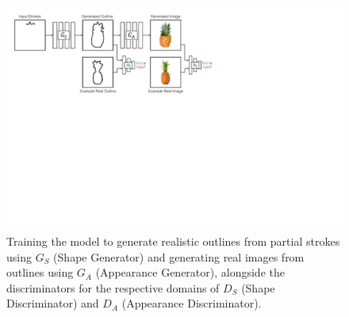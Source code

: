 \begin{figure}[t]
    \centering
    \includegraphics[width=\linewidth]{paper_images/isf_method_v3.pdf}
    \caption{Training the model to generate realistic outlines from partial strokes using $G_S$ (Shape Generator) and generating real images from outlines using $G_A$ (Appearance Generator), alongside the discriminators for the respective domains of $D_S$ (Shape Discriminator) and $D_A$ (Appearance Discriminator).
    }\label{fig:SketchFillNet}
\end{figure}



\label{sec:methods}




